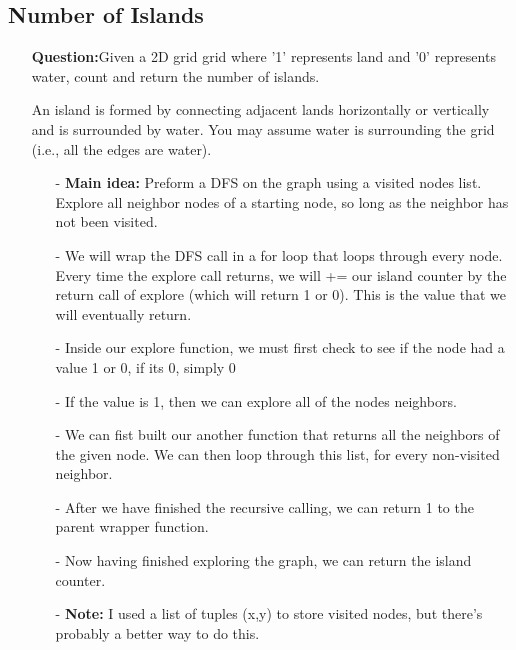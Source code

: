 \documentclass[12pt]{article}
\begin{document}
\subsection{Number of Islands}
\begin{enumerate}
  \item[] \textbf{Question:}Given a 2D grid grid where '1' represents land and '0' represents water, count and return the number of islands.

An island is formed by connecting adjacent lands horizontally or vertically and is surrounded by water. You may assume water is surrounding the grid (i.e., all the edges are water). 

    \begin{enumerate}
      \item[-] \textbf{Main idea:} Preform a DFS on the graph using a visited nodes list. Explore all neighbor nodes of a starting node, so long as the neighbor has not been visited. 
      \item[-] We will wrap the DFS call in a for loop that loops through every node. Every time the explore call returns, we will += our island counter by the return call of explore (which will return 1 or 0). This is the value that we will eventually return.
      \item[-] Inside our explore function, we must first check to see if the node had a value 1 or 0, if its 0, simply 0
      \item[-] If the value is 1, then we can explore all of the nodes neighbors. 
      \item[-] We can fist built our another function that returns all the neighbors of the given node. We can then loop through this list, for every non-visited neighbor.
      \item[-] After we have finished the recursive calling, we can return 1 to the parent wrapper function. 
      \item[-] Now having finished exploring the graph, we can return the island counter. 
      \item[-] \textbf{Note:} I used a list of tuples (x,y) to store visited nodes, but there's probably a better way to do this. 
    \end{enumerate}
\end{enumerate}
\end{document}
